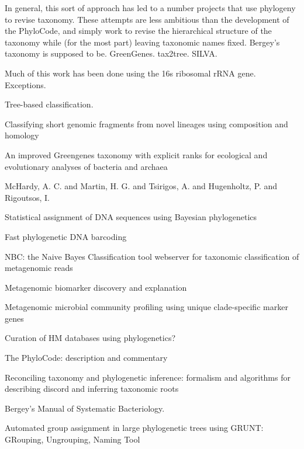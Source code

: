 \documentclass{amsart}
\begin{document}
In general, this sort of approach has led to a number projects that use phylogeny to revise taxonomy.
These attempts are less ambitious than the development of the PhyloCode, and simply work to revise the hierarchical structure of the taxonomy while (for the most part) leaving taxonomic names fixed.
Bergey's taxonomy is supposed to be.
GreenGenes.
tax2tree.
SILVA.

Much of this work has been done using the 16s ribosomal rRNA gene.
Exceptions.

Tree-based classification.

\cite{parks2011classifying}
Classifying short genomic fragments from novel lineages using composition and homology

\cite{mcdonald2011improved}
An improved Greengenes taxonomy with explicit ranks for ecological and evolutionary analyses of bacteria and archaea

\cite{phylopythia}
McHardy, A. C.  and Martin, H. G.  and Tsirigos, A.  and Hugenholtz, P.  and Rigoutsos, I.

\cite{munch2008statistical}
Statistical assignment of DNA sequences using Bayesian phylogenetics

\cite{munch2008fast}
Fast phylogenetic DNA barcoding

\cite{rosen2011nbc}
NBC: the Naive Bayes Classification tool webserver for taxonomic classification of metagenomic reads


\cite{segata2011metagenomic}
Metagenomic biomarker discovery and explanation

\cite{segata2012metagenomic}
Metagenomic microbial community profiling using unique clade-specific marker genes



Curation of HM databases using phylogenetics?

\cite{forey2001phylocode}
{The PhyloCode: description and commentary}

\cite{matsen2011reconciling}
Reconciling taxonomy and phylogenetic inference: formalism and algorithms for describing discord and inferring taxonomic roots

\cite{carma}


\cite{kreig1984bergey}
Bergey's Manual of Systematic Bacteriology.

\cite{dalevi2007automated}
Automated group assignment in large phylogenetic trees using GRUNT: GRouping, Ungrouping, Naming Tool
\end{document}
